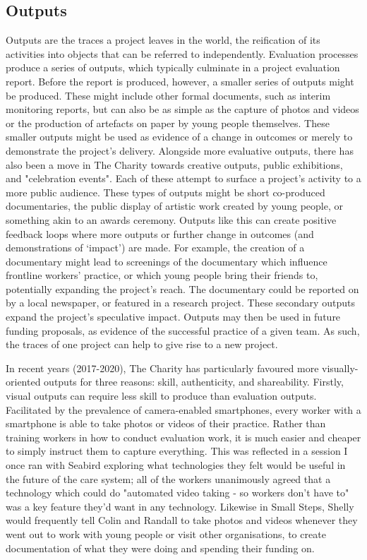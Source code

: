 \subsection{Outputs}
\label{subsec:6-3-2-outputs}
Outputs are the traces a project leaves in the world, the reification of its activities into objects that can be referred to independently. Evaluation processes produce a series of outputs, which typically culminate in a project evaluation report. Before the report is produced, however, a smaller series of outputs might be produced. These might include other formal documents, such as interim monitoring reports, but can also be as simple as the capture of photos and videos or the production of artefacts on paper by young people themselves. These smaller outputs might be used as evidence of a change in outcomes or merely to demonstrate the project's delivery.  Alongside more evaluative outputs, there has also been a move in The Charity towards creative outputs, public exhibitions, and "celebration events". Each of these attempt to surface a project's activity to a more public audience. These types of outputs might be short co-produced documentaries, the public display of artistic work created by young people, or something akin to an awards ceremony. Outputs like this can create positive feedback loops where more outputs or further change in outcomes (and demonstrations of `impact') are made. For example, the creation of a documentary might lead to screenings of the documentary which influence frontline workers' practice, or which young people bring their friends to, potentially expanding the project's reach. The documentary could be reported on by a local newspaper, or featured in a research project. These secondary outputs expand the project's speculative impact. Outputs may then be used in future funding proposals, as evidence of the successful practice of a given team. As such, the traces of one project can help to give rise to a new project.

In recent years (2017-2020), The Charity has particularly favoured more visually-oriented outputs for three reasons: skill, authenticity, and shareability. Firstly, visual outputs can require less skill to produce than evaluation outputs. Facilitated by the prevalence of camera-enabled smartphones, every worker with a smartphone is able to take photos or videos of their practice. Rather than training workers in how to conduct evaluation work, it is much easier and cheaper to simply instruct them to capture everything. This was reflected in a session I once ran with Seabird exploring what technologies they felt would be useful in the future of the care system; all of the workers unanimously agreed that a technology which could do "automated video taking - so workers don’t have to" was a key feature they'd want in any technology. Likewise in Small Steps, Shelly would frequently tell Colin and Randall to take photos and videos whenever they went out to work with young people or visit other organisations, to create documentation of what they were doing and spending their funding on. 


